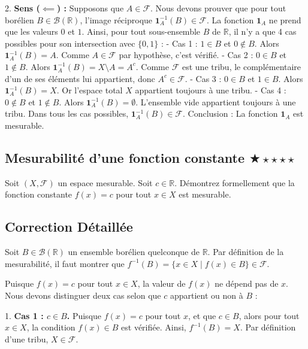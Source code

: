 \documentclass[11pt,a4paper]{article}
\begin{document}
2. \textbf{Sens ($\impliedby$) :}
   Supposons que $A \in \mathcal{F}$. Nous devons prouver que pour tout borélien $B \in \mathcal{B}(\mathbb{R})$, l'image réciproque $\mathbf{1}_A^{-1}(B) \in \mathcal{F}$.
   La fonction $\mathbf{1}_A$ ne prend que les valeurs $0$ et $1$. Ainsi, pour tout sous-ensemble $B$ de $\mathbb{R}$, il n'y a que 4 cas possibles pour son intersection avec $\{0, 1\}$ :
   - Cas 1 : $1 \in B$ et $0 \notin B$. Alors $\mathbf{1}_A^{-1}(B) = A$. Comme $A \in \mathcal{F}$ par hypothèse, c'est vérifié.
   - Cas 2 : $0 \in B$ et $1 \notin B$. Alors $\mathbf{1}_A^{-1}(B) = X \setminus A = A^c$. Comme $\mathcal{F}$ est une tribu, le complémentaire d'un de ses éléments lui appartient, donc $A^c \in \mathcal{F}$.
   - Cas 3 : $0 \in B$ et $1 \in B$. Alors $\mathbf{1}_A^{-1}(B) = X$. Or l'espace total $X$ appartient toujours à une tribu.
   - Cas 4 : $0 \notin B$ et $1 \notin B$. Alors $\mathbf{1}_A^{-1}(B) = \emptyset$. L'ensemble vide appartient toujours à une tribu.
   Dans tous les cas possibles, $\mathbf{1}_A^{-1}(B) \in \mathcal{F}$.
   Conclusion : La fonction $\mathbf{1}_A$ est mesurable.


\vspace{0.5cm}

\subsection*{Mesurabilité d'une fonction constante \quad $\bigstar\star\star\star\star$}

Soit $(X, \mathcal{F})$ un espace mesurable. Soit $c \in \mathbb{R}$. Démontrez formellement que la fonction constante $f(x) = c$ pour tout $x \in X$ est mesurable.

\subsection*{Correction Détaillée}

Soit $B \in \mathcal{B}(\mathbb{R})$ un ensemble borélien quelconque de $\mathbb{R}$.
Par définition de la mesurabilité, il faut montrer que $f^{-1}(B) = \{x \in X \mid f(x) \in B\} \in \mathcal{F}$.

Puisque $f(x) = c$ pour tout $x \in X$, la valeur de $f(x)$ ne dépend pas de $x$. Nous devons distinguer deux cas selon que $c$ appartient ou non à $B$ :

1. \textbf{Cas 1 : $c \in B$.}
   Puisque $f(x) = c$ pour tout $x$, et que $c \in B$, alors pour tout $x \in X$, la condition $f(x) \in B$ est vérifiée.
   Ainsi, $f^{-1}(B) = X$.
   Par définition d'une tribu, $X \in \mathcal{F}$.
\end{document}
